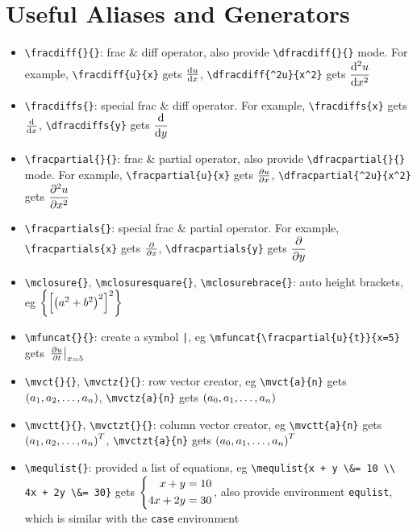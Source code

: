 \documentclass{article}
\begin{document}
\section{Useful Aliases and Generators}
\begin{itemize}
\item \lstinline`\fracdiff{}{}`: frac \& diff operator, also provide \lstinline`\dfracdiff{}{}` mode. For example, \lstinline`\fracdiff{u}{x}` gets ${\frac{\operatorname{d\!} {u}}{\operatorname{d\!} {x}}}$, \lstinline`\dfracdiff{^2u}{x^2}` gets ${\dfrac{\operatorname{d\!} {^2u}}{\operatorname{d\!} {x^2}}}$

\item \lstinline`\fracdiffs{}`: special frac \& diff operator. For example, \lstinline`\fracdiffs{x}` gets ${{\frac{\operatorname{d\!} {}}{\operatorname{d\!} {x}}}}$, \lstinline`\dfracdiffs{y}` gets ${{\dfrac{\operatorname{d\!} {}}{\operatorname{d\!} {y}}}}$

\item \lstinline`\fracpartial{}{}`: frac \& partial operator, also provide \lstinline`\dfracpartial{}{}` mode. For example, \lstinline`\fracpartial{u}{x}` gets ${\frac{\partial {u}}{\partial {x}}}$, \lstinline`\dfracpartial{^2u}{x^2}` gets ${\dfrac{\partial {^2u}}{\partial {x^2}}}$

\item \lstinline`\fracpartials{}`: special frac \& partial operator. For example, \lstinline`\fracpartials{x}` gets ${{\frac{\partial {}}{\partial {x}}}}$, \lstinline`\dfracpartials{y}` gets ${{\dfrac{\partial {}}{\partial {y}}}}$

\item \lstinline`\mclosure{}`, \lstinline`\mclosuresquare{}`, \lstinline`\mclosurebrace{}`: auto height brackets, eg ${\left\{ { {\left[ { {\left( {a^2 + b^2} \right)}^2 } \right]}^2 } \right\}}$

\item \lstinline`\mfuncat{}{}`: create a symbol \lstinline`|`, eg \lstinline`\mfuncat{\fracpartial{u}{t}}{x=5}` gets ${\left.{{\frac{\partial {u}}{\partial {t}}}} \right|}_{x=5}$

\item \lstinline`\mvct{}{}`, \lstinline`\mvctz{}{}`: row vector creator, eg \lstinline`\mvct{a}{n}` gets ${ ({a}_1, {a}_2, \ldots, {a}_{n}) }$, \lstinline`\mvctz{a}{n}` gets ${ ({a}_0, {a}_1, \ldots, {a}_{n}) }$

\item \lstinline`\mvctt{}{}`, \lstinline`\mvctzt{}{}`: column vector creator, eg \lstinline`\mvctt{a}{n}` gets ${ { ({a}_1, {a}_2, \ldots, {a}_{n}) }^T }$, \lstinline`\mvctzt{a}{n}` gets ${ { ({a}_0, {a}_1, \ldots, {a}_{n}) }^T }$

\item \lstinline`\mequlist{}`: provided a list of equations, eg \lstinline`\mequlist{x + y \&= 10 \\ 4x + 2y \&= 30}` gets ${\left\{ \begin{aligned} x + y &= 10 \\ 4x + 2y &= 30 \end{aligned} \right.}$, also provide environment \lstinline`equlist`, which is similar with the \lstinline`case` environment
\end{itemize}

\end{document}
